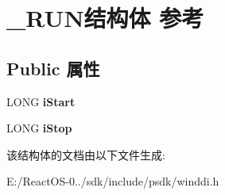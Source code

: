 \hypertarget{struct___r_u_n}{}\section{\+\_\+\+R\+U\+N结构体 参考}
\label{struct___r_u_n}
\subsection*{Public 属性}
\begin{DoxyCompactItemize}
\item 
\mbox{\label{struct___r_u_n_a2053868d47a0267e00f5aec768560c7a}} 
L\+O\+NG {\bfseries i\+Start}
\item 
\mbox{\label{struct___r_u_n_a4320ddbc1fe9219df277329484a6ccc5}} 
L\+O\+NG {\bfseries i\+Stop}
\end{DoxyCompactItemize}


该结构体的文档由以下文件生成\+:\begin{DoxyCompactItemize}
\item 
E\+:/\+React\+O\+S-\/0../sdk/include/psdk/winddi.\+h\end{DoxyCompactItemize}
